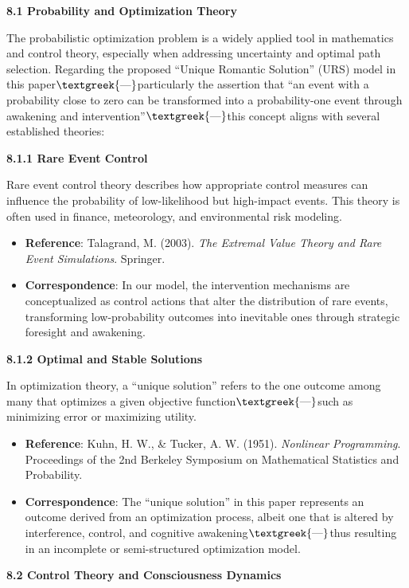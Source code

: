 \documentclass[a4paper]{article}
\begin{document}
\textbf{8.1 Probability and Optimization Theory}

The probabilistic optimization problem is a widely applied tool in mathematics and control theory, especially when
addressing uncertainty and optimal path selection. Regarding the proposed “Unique Romantic Solution” (URS) model in
this paper$\text{\textgreek{—}}$particularly the assertion that “an event with a probability close to zero can be
transformed into a probability-one event through awakening and intervention”$\text{\textgreek{—}}$this concept aligns
with several established theories:

\textbf{8.1.1 Rare Event Control}

Rare event control theory describes how appropriate control measures can influence the probability of low-likelihood but
high-impact events. This theory is often used in finance, meteorology, and environmental risk modeling.

\begin{itemize}[series=listWWNumxx,label=[F0B7?]]
\item \textbf{Reference}: Talagrand, M. (2003). \textit{The Extremal Value Theory and Rare Event Simulations}. Springer.
\item \textbf{Correspondence}: In our model, the intervention mechanisms are conceptualized as control actions that
alter the distribution of rare events, transforming low-probability outcomes into inevitable ones through strategic
foresight and awakening.
\end{itemize}
\textbf{8.1.2 Optimal and Stable Solutions}

In optimization theory, a “unique solution” refers to the one outcome among many that optimizes a given objective
function$\text{\textgreek{—}}$such as minimizing error or maximizing utility.

\begin{itemize}[series=listWWNumxxi,label=[F0B7?]]
\item \textbf{Reference}: Kuhn, H. W., \& Tucker, A. W. (1951). \textit{Nonlinear Programming}. Proceedings of the 2nd
Berkeley Symposium on Mathematical Statistics and Probability.
\item \textbf{Correspondence}: The “unique solution” in this paper represents an outcome derived from an optimization
process, albeit one that is altered by interference, control, and cognitive awakening$\text{\textgreek{—}}$thus
resulting in an incomplete or semi-structured optimization model.
\end{itemize}
\textbf{8.2 Control Theory and Consciousness Dynamics}
\end{document}

